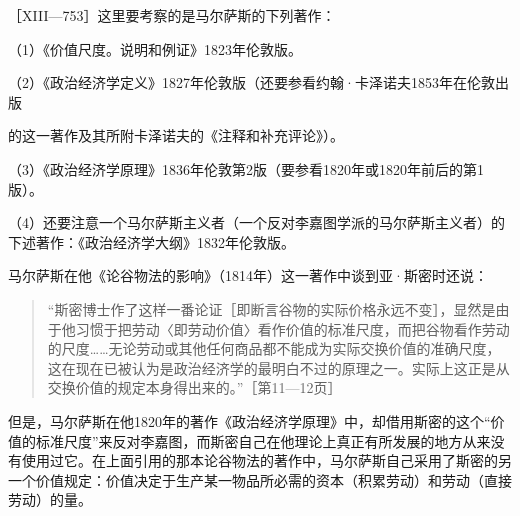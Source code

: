 


［XIII—753］这里要考察的是马尔萨斯的下列著作：

（1）《价值尺度。说明和例证》1823年伦敦版。

（2）《政治经济学定义》1827年伦敦版（还要参看约翰·卡泽诺夫1853年在伦敦出版

的这一著作及其所附卡泽诺夫的《注释和补充评论》）。

（3）《政治经济学原理》1836年伦敦第2版（要参看1820年或1820年前后的第1版）。

（4）还要注意一个马尔萨斯主义者（一个反对李嘉图学派的马尔萨斯主义者）的下述著作：《政治经济学大纲》1832年伦敦版。

马尔萨斯在他《论谷物法的影响》（1814年）这一著作中谈到亚·斯密时还说：

\begin{quote}{“斯密博士作了这样一番论证［即断言谷物的实际价格永远不变］，显然是由于他习惯于把劳动〈即劳动价值〉看作价值的标准尺度，而把谷物看作劳动的尺度……无论劳动或其他任何商品都不能成为实际交换价值的准确尺度，这在现在已被认为是政治经济学的最明白不过的原理之一。实际上这正是从交换价值的规定本身得出来的。”［第11—12页］}\end{quote}

但是，马尔萨斯在他1820年的著作《政治经济学原理》中，却借用斯密的这个“价值的标准尺度”来反对李嘉图，而斯密自己在他理论上真正有所发展的地方从来没有使用过它。在上面引用的那本论谷物法的著作中，马尔萨斯自己采用了斯密的另一个价值规定：价值决定于生产某一物品所必需的资本（积累劳动）和劳动（直接劳动）的量。


